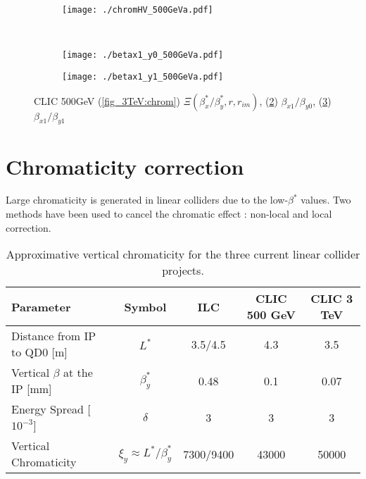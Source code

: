 \begin{figure}
\begin{subfigure}{1.0\textwidth}
 \texttt{[image: ./chromHV\_500GeVa.pdf]}\caption{}\label{fig_chrom:b}
 \end{subfigure}\\
 \begin{subfigure}{0.5\textwidth}
 \texttt{[image: ./betax1\_y0\_500GeVa.pdf]}\caption{}\label{fig_500GeV:bx1_y0}
 \end{subfigure}
  \begin{subfigure}{0.5\textwidth}
 \texttt{[image: ./betax1\_y1\_500GeVa.pdf]}\caption{}\label{fig_500GeV:bx1_y1}
 \end{subfigure}
 \caption{CLIC 500GeV (\ref{fig_3TeV:chrom}) $\Xi(\beta^*_x/\beta^*_y,r,r_{im})$, (\ref{fig_500GeV:bx1_y0}) $\beta_{x1}/\beta_{y0}$, (\ref{fig_500GeV:bx1_y1}) $\beta_{x1}/\beta_{y1}$}\label{f:fig_500GeV}
\end{figure}
\clearpage

\section{Chromaticity correction}\label{s:chromcorr}
Large chromaticity is generated in linear colliders due to the low-$\beta^*$ values. Two methods have been used to cancel the chromatic effect : non-local and local correction.
\begin{table}[!htb]
\scriptsize
\centering
\begin{tabular}{l|c||c|c|c}\hline
Parameter & Symbol & ILC & CLIC 500 GeV& CLIC 3 TeV\\\hline\hline
Distance from IP to QD0 [m] & $L^*$& 3.5/4.5 & 4.3 & 3.5\\
Vertical $\beta$ at the IP [mm] &$\beta_y^*$& 0.48 & 0.1&0.07\\
Energy Spread [$10^{-3}$]& $\delta$&3&3&3\\\hline
Vertical Chromaticity & $\xi_y\approx L^*/\beta^*_y$&7300/9400&43000&50000\\\hline
\end{tabular}\caption{Approximative vertical chromaticity for the three current linear collider projects.}\label{t:lum_rad}
\end{table}
